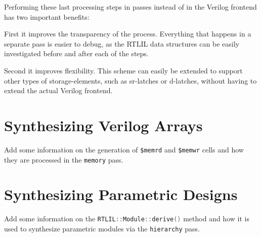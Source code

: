 Performing these last processing steps in passes instead of in the Verilog frontend has two important benefits:

First it improves the transparency of the process. Everything that happens in a separate pass is easier to debug,
as the RTLIL data structures can be easily investigated before and after each of the steps.

Second it improves flexibility. This scheme can easily be extended to support other types of storage-elements, such
as sr-latches or d-latches, without having to extend the actual Verilog frontend.

\section{Synthesizing Verilog Arrays}

\begin{fixme}
Add some information on the generation of {\tt \$memrd} and {\tt \$memwr} cells
and how they are processed in the {\tt memory} pass.
\end{fixme}

\section{Synthesizing Parametric Designs}

\begin{fixme}
Add some information on the \lstinline[language=C++]{RTLIL::Module::derive()} method and how it
is used to synthesize parametric modules via the {\tt hierarchy} pass.
\end{fixme}
